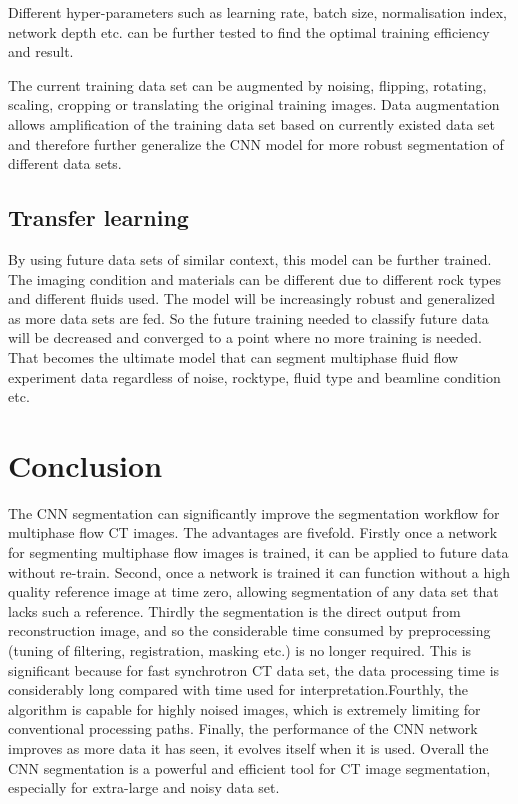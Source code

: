 \documentclass[draft,linenumbers]{agujournal2018}
\begin{document}
Different hyper-parameters such as learning rate, batch size, normalisation index, network depth etc. can be further tested to find the optimal training efficiency and result.

The current training data set can be augmented by noising, flipping, rotating, scaling, cropping or translating the original training images. Data augmentation allows amplification of the training data set based on currently existed data set and therefore further generalize the CNN model for more robust segmentation of different data sets.

\subsection{Transfer learning}
By using future data sets of similar context, this model can be further trained. The imaging condition and materials can be different due to different rock types and different fluids used. The model will be increasingly robust and generalized as more data sets are fed. So the future training needed to classify future data will be decreased and converged to a point where no more training is needed. That becomes the ultimate model that can segment multiphase fluid flow experiment data regardless of noise, rocktype, fluid type and beamline condition etc.

\section{Conclusion}
The CNN segmentation can significantly improve the segmentation workflow for multiphase flow \textmu CT images. The advantages are fivefold. Firstly once a network for segmenting multiphase flow images is trained, it can be applied to future data without re-train. Second, once a network is trained it can function without a high quality reference image at time zero, allowing segmentation of any data set that lacks such a reference. Thirdly the segmentation is the direct output from reconstruction image, and so the considerable time consumed by preprocessing (tuning of filtering, registration, masking etc.) is no longer required. This is significant because for fast synchrotron \textmu CT data set, the data processing time is considerably long compared with time used for interpretation.Fourthly, the algorithm is capable for highly noised images, which is extremely limiting for conventional processing paths. Finally, the performance of the CNN network improves as more data it has seen, it evolves itself when it is used. Overall the CNN segmentation is a powerful and efficient tool for \textmu CT image segmentation, especially for extra-large and noisy data set.
\end{document}
